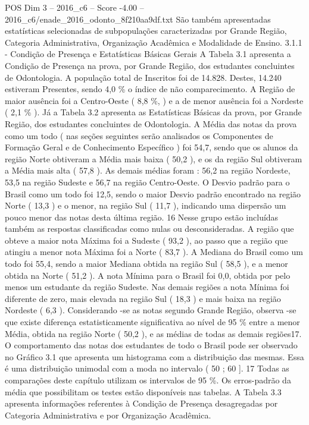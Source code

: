 \begin{textsample}{POS Dim 3 – 2016\_c6 – Score -4.00 – 2016\_c6/enade\_2016\_odonto\_8f210aa9df.txt}
São também apresentadas estatísticas selecionadas de subpopulações caracterizadas por Grande Região, Categoria Administrativa, Organização Acadêmica e Modalidade de Ensino. 3.1.1 - Condição de Presença e Estatísticas Básicas Gerais A Tabela 3.1 apresenta a Condição de Presença na prova, por Grande Região, dos estudantes concluintes de Odontologia.
A população total de Inscritos foi de 14.828.
Destes, 14.240 estiveram Presentes, sendo 4,0 \% o índice de não comparecimento.
A Região de maior ausência foi a Centro-Oeste ( 8,8 \%, ) e a de menor ausência foi a Nordeste ( 2,1 \% ).
Já a Tabela 3.2 apresenta as Estatísticas Básicas da prova, por Grande Região, dos estudantes concluintes de Odontologia.
A Média das notas da prova como um todo ( nas seções seguintes serão analisados os Componentes de Formação Geral e de Conhecimento Específico ) foi 54,7, sendo que os alunos da região Norte obtiveram a Média mais baixa ( 50,2 ), e os da região Sul obtiveram a Média mais alta ( 57,8 ).
As demais médias foram : 56,2 na região Nordeste, 53,5 na região Sudeste e 56,7 na região Centro-Oeste.
O Desvio padrão para o Brasil como um todo foi 12,5, sendo o maior Desvio padrão encontrado na região Norte ( 13,3 ) e o menor, na região Sul ( 11,7 ), indicando uma dispersão um pouco menor das notas desta última região. 16 Nesse grupo estão incluídas também as respostas classificadas como nulas ou desconsideradas.
A região que obteve a maior nota Máxima foi a Sudeste ( 93,2 ), ao passo que a região que atingiu a menor nota Máxima foi a Norte ( 83,7 ).
A Mediana do Brasil como um todo foi 55,4, sendo a maior Mediana obtida na região Sul ( 58,5 ), e a menor obtida na Norte ( 51,2 ).
A nota Mínima para o Brasil foi 0,0, obtida por pelo menos um estudante da região Sudeste.
Nas demais regiões a nota Mínima foi diferente de zero, mais elevada na região Sul ( 18,3 ) e mais baixa na região Nordeste ( 6,3 ).
Considerando -se as notas segundo Grande Região, observa -se que existe diferença estatisticamente significativa ao nível de 95 \% entre a menor Média, obtida na região Norte ( 50,2 ), e as médias de todas as demais regiões17.
O comportamento das notas dos estudantes de todo o Brasil pode ser observado no Gráfico 3.1 que apresenta um histograma com a distribuição das mesmas.
Essa é uma distribuição unimodal com a moda no intervalo ( 50 ; 60 ]. 17 Todas as comparações deste capítulo utilizam os intervalos de 95 \%.
Os erros-padrão da média que possibilitam os testes estão disponíveis nas tabelas.
A Tabela 3.3 apresenta informações referentes à Condição de Presença desagregadas por Categoria Administrativa e por Organização Acadêmica.

\end{textsample}
